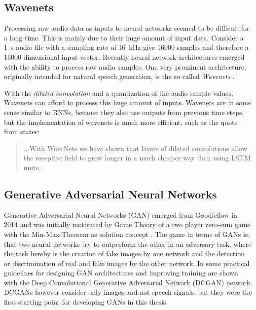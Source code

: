 \subsection{Wavenets}\label{sec:prev_nn_wavenet}
Processing raw audio data as inputs to neural networks seemed to be difficult for a long time.
This is mainly due to their huge amount of input data. 
Consider a \SI{1}{\second} audio file with a sampling rate of \SI{16}{\kilo\hertz} give 16000 samples and therefore a 16000 dimensional input vector.
Recently neural network architectures emerged with the ability to process raw audio samples.
One very prominent architecture, originally intended for natural speech generation, is the so called \emph{Wavenets} \cite{Oord2016}.

With the \emph{dilated convolution} and a quantization of the audio sample values, Wavenets can afford to process this huge amount of inputs.
Wavenets are in some sense similar to RNNs, because they also use outputs from previous time steps, but the implementation of wavenets is much more efficient, such as the quote from \cite{Oord2016} states:
\begin{quote}
  ...With WaveNets we have shown that layers of dilated convolutions allow the receptive field to grow longer in a much cheaper way than using LSTM units...
\end{quote}



\subsection{Generative Adversarial Neural Networks}\label{sec:prev_nn_adv}
Generative Adversarial Neural Networks (GAN) emerged from Goodfellow in 2014 \cite{Goodfellow2014} and was initially motivated by Game Theory of a two player zero-sum game with the Min-Max-Theorem as solution concept \cite{VonNeumann1944}.
The game in terms of GANs is, that two neural networks try to outperform the other in an adversary task, where the task hereby is the creation of fake images by one network and the detection or discrimination of real and fake images by the other network.
In \cite{Radford2016} some practical guidelines for designing GAN architectures and improving training are shown with the Deep Convolutional Generative Adversarial Network (DCGAN) network.
DCGANs however consider only images and not speech signals, but they were the first starting point for developing GANs in this thesis.

